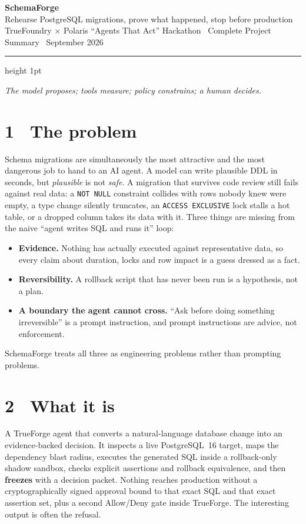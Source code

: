 \documentclass[8pt,a4paper]{extarticle}
\newcommand{\code}[1]{\texttt{\small #1}}
\begin{document}
\begin{center}
  {\color{sfnavy}\LARGE\bfseries SchemaForge}\\[0.5ex]
  {\normalsize Rehearse PostgreSQL migrations, prove what happened, stop before production}\\[0.4ex]
  {\footnotesize TrueFoundry $\times$ Polaris ``Agents That Act'' Hackathon \textperiodcentered\ Complete Project Summary \textperiodcentered\ September 2026}
\end{center}
\vspace{0.1ex}
{\color{sfrule}\hrule height 1pt}
\vspace{0.7ex}

\colorbox{sfbox}{\parbox{\dimexpr\linewidth-2\fboxsep}{\centering\itshape
The model proposes; tools measure; policy constrains; a human decides.}}

\section*{1 \textperiodcentered\ The problem}
Schema migrations are simultaneously the most attractive and the most dangerous job to hand to an AI agent. A model can write plausible DDL in seconds, but \emph{plausible} is not \emph{safe}. A migration that survives code review still fails against real data: a \code{NOT NULL} constraint collides with rows nobody knew were empty, a type change silently truncates, an \code{ACCESS EXCLUSIVE} lock stalls a hot table, or a dropped column takes its data with it. Three things are missing from the naive ``agent writes SQL and runs it'' loop:

\begin{itemize}
  \item \textbf{Evidence.} Nothing has actually executed against representative data, so every claim about duration, locks and row impact is a guess dressed as a fact.
  \item \textbf{Reversibility.} A rollback script that has never been run is a hypothesis, not a plan.
  \item \textbf{A boundary the agent cannot cross.} ``Ask before doing something irreversible'' is a prompt instruction, and prompt instructions are advice, not enforcement.
\end{itemize}

SchemaForge treats all three as engineering problems rather than prompting problems.

\section*{2 \textperiodcentered\ What it is}
A TrueForge agent that converts a natural-language database change into an evidence-backed decision. It inspects a live PostgreSQL~16 target, maps the dependency blast radius, executes the generated SQL inside a rollback-only shadow sandbox, checks explicit assertions and rollback equivalence, and then \textbf{freezes} with a decision packet. Nothing reaches production without a cryptographically signed approval bound to that exact SQL and that exact assertion set, plus a second Allow/Deny gate inside TrueForge. The interesting output is often the refusal.
\end{document}
